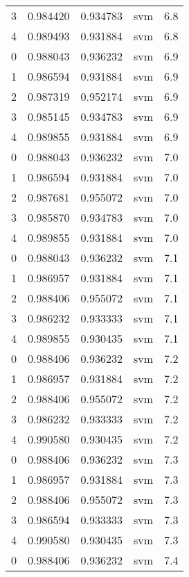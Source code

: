 \begin{tabular}{rrrlr}
     3 & 0.984420 & 0.934783 &      svm &        6.8 \\
     4 & 0.989493 & 0.931884 &      svm &        6.8 \\
     0 & 0.988043 & 0.936232 &      svm &        6.9 \\
     1 & 0.986594 & 0.931884 &      svm &        6.9 \\
     2 & 0.987319 & 0.952174 &      svm &        6.9 \\
     3 & 0.985145 & 0.934783 &      svm &        6.9 \\
     4 & 0.989855 & 0.931884 &      svm &        6.9 \\
     0 & 0.988043 & 0.936232 &      svm &        7.0 \\
     1 & 0.986594 & 0.931884 &      svm &        7.0 \\
     2 & 0.987681 & 0.955072 &      svm &        7.0 \\
     3 & 0.985870 & 0.934783 &      svm &        7.0 \\
     4 & 0.989855 & 0.931884 &      svm &        7.0 \\
     0 & 0.988043 & 0.936232 &      svm &        7.1 \\
     1 & 0.986957 & 0.931884 &      svm &        7.1 \\
     2 & 0.988406 & 0.955072 &      svm &        7.1 \\
     3 & 0.986232 & 0.933333 &      svm &        7.1 \\
     4 & 0.989855 & 0.930435 &      svm &        7.1 \\
     0 & 0.988406 & 0.936232 &      svm &        7.2 \\
     1 & 0.986957 & 0.931884 &      svm &        7.2 \\
     2 & 0.988406 & 0.955072 &      svm &        7.2 \\
     3 & 0.986232 & 0.933333 &      svm &        7.2 \\
     4 & 0.990580 & 0.930435 &      svm &        7.2 \\
     0 & 0.988406 & 0.936232 &      svm &        7.3 \\
     1 & 0.986957 & 0.931884 &      svm &        7.3 \\
     2 & 0.988406 & 0.955072 &      svm &        7.3 \\
     3 & 0.986594 & 0.933333 &      svm &        7.3 \\
     4 & 0.990580 & 0.930435 &      svm &        7.3 \\
     0 & 0.988406 & 0.936232 &      svm &        7.4 \\

\end{tabular}
